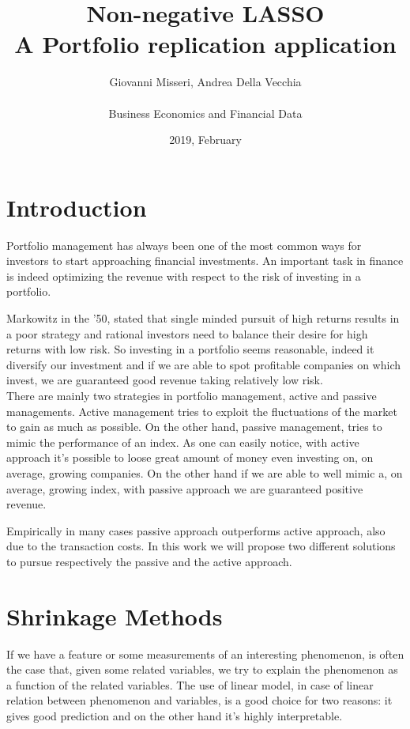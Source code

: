 \documentclass{article}%
\title{%
  Non-negative LASSO \\
  \large A Portfolio replication application}
\date{2019, February}
\author{Giovanni Misseri, Andrea Della Vecchia \\ \\ 
Business Economics and Financial Data}
\begin{document}
\maketitle
\tableofcontents
\newpage
\section{Introduction}

Portfolio management has always been one of the most common ways for investors to start approaching financial investments. An important task in finance is indeed optimizing the revenue with respect to the risk of investing in a portfolio.

Markowitz in the '50, stated that single minded pursuit of high returns results in a poor strategy and rational investors need to balance their desire for high returns with low risk. So investing in a portfolio seems reasonable, indeed it diversify our investment and if we are able to spot profitable companies on which invest, we are guaranteed good revenue taking relatively low risk.
\\

There are mainly two strategies in portfolio management, active and passive managements. Active management tries to exploit the fluctuations of the market to gain as much as possible. On the other hand, passive management, tries to mimic the performance of an index. As one can easily notice, with active approach it's possible to loose great amount of money even investing on, on average, growing companies. On the other hand if we are able to well mimic a, on average, growing index, with passive approach we are guaranteed positive revenue.

Empirically in many cases passive approach outperforms active approach, also due to the transaction costs. In this work we will propose two different solutions to pursue respectively the passive and the active approach.

\newpage
\section{Shrinkage Methods}


If we have a feature or some measurements of an interesting phenomenon, is often the case that, given some related variables, we try to explain the phenomenon as a function of the related variables. The use of linear model, in case of linear relation between phenomenon and variables, is a good choice for two reasons: it gives good prediction and on the other hand it's highly interpretable. 
\end{document}
